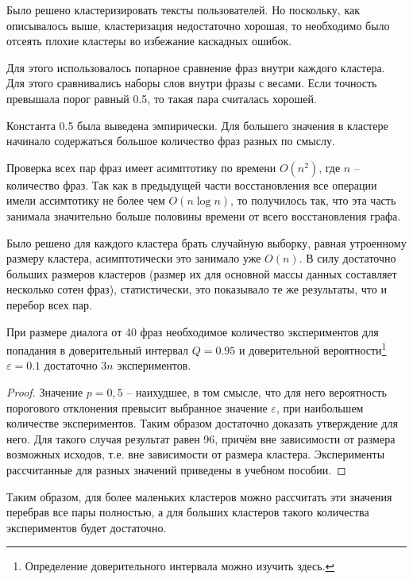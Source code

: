 \documentclass[times,specification,annotation]{itmo-student-thesis}
\begin{document}
	Было решено кластеризировать тексты пользователей. Но поскольку, как описывалось выше, кластеризация недостаточно хорошая, то необходимо было отсеять плохие кластеры во избежание каскадных ошибок.
	
	Для этого использовалось попарное сравнение фраз внутри каждого кластера. Для этого сравнивались наборы слов внутри фразы с весами. Если точность превышала порог равный 0.5, то такая пара считалась хорошей.
	
	Константа 0.5 была выведена эмпирически. Для большего значения в кластере начинало содержаться большое количество фраз разных по смыслу. 
	
	Проверка всех пар фраз имеет асимптотику по времени $O(n^2)$, где $n$ -- количество фраз. Так как в предыдущей части восстановления все операции имели ассимтотику не более чем $O(n \log n)$, то получилось так, что эта часть занимала значительно больше половины времени от всего восстановления графа. 
	
	Было решено для каждого кластера брать случайную выборку, равная утроенному размеру кластера, асимптотически это занимало уже $O(n)$. В силу достаточно больших размеров кластеров (размер их для основной массы данных составляет несколько сотен фраз), статистически, это показывало те же результаты, что и перебор всех пар.
	
	\begin{prop}
		При размере диалога от 40 фраз необходимое количество экспериментов для попадания в доверительный интервал $Q=0.95$ и доверительной вероятности\footnote{Определение доверительного интервала можно изучить здесь.\cite{чернова2007теория}} $\varepsilon=0.1$ достаточно $3n$ экспериментов.
	\end{prop}
	\begin{proof}
		Значение $p=0,5$ -- наихудшее, в том смысле, что для него вероятность порогового отклонения превысит выбранное значение $\varepsilon$, при наибольшем количестве экспериментов. Таким образом достаточно доказать утверждение для него. Для такого случая результат равен 96, причём вне зависимости от размера возможных исходов, т.е. вне зависимости от размера кластера. Эксперименты рассчитанные для разных значений приведены в учебном пособии.\cite{мухинмоделирование}
	\end{proof}
	
	Таким образом, для более маленьких кластеров можно рассчитать эти значения перебрав все пары полностью, а для больших кластеров такого количества экспериментов будет достаточно.
	
\end{document}
